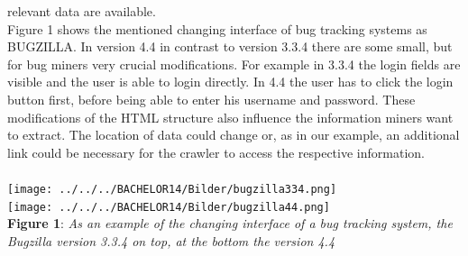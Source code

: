 \documentclass[12pt,a4paper,final]{article}
\begin{document}
relevant data are available. \\ Figure 1 shows the mentioned changing interface of bug tracking systems as BUGZILLA. In version 4.4 in contrast to version 3.3.4 there are some small, but for bug miners very crucial modifications. For example in 3.3.4 the login fields are visible and the user is able to login directly. In 4.4 the user has to click the login button first, before being able to enter his username and password. These modifications of the HTML structure also influence the information miners want to extract. The location of data could change or, as in our example, an additional link could be necessary for the crawler to access the respective information. \pagebreak
\\ \\ \texttt{[image: ../../../BACHELOR14/Bilder/bugzilla334.png]} \\\texttt{[image: ../../../BACHELOR14/Bilder/bugzilla44.png]}  \\\textbf{Figure 1}: \textit{As an example of the changing interface of a bug tracking system, the Bugzilla version 3.3.4 on top, at the bottom the version 4.4} \\ \pagebreak
\end{document}
